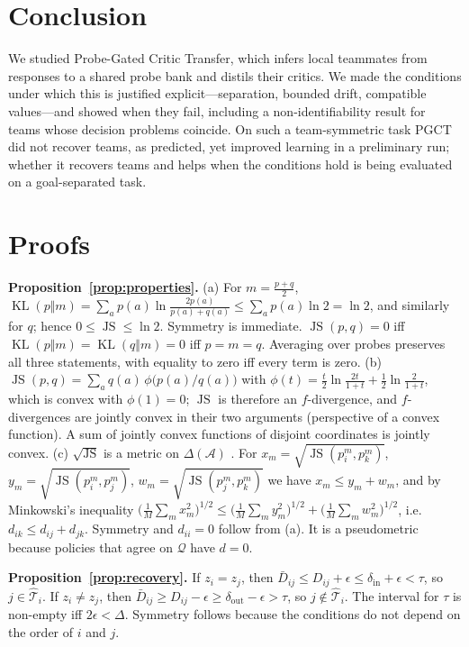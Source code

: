 \documentclass{article}
\theoremstyle{remark}
\newcommand{\JS}{\operatorname{JS}}
\newcommand{\KL}{\operatorname{KL}}
\newcommand{\ours}{PGCT}
\begin{document}
\section{Conclusion}
We studied Probe-Gated Critic Transfer, which infers local teammates from responses to a shared probe bank and distils their critics.
We made the conditions under which this is justified explicit---separation, bounded drift, compatible values---and showed when they
fail, including a non-identifiability result for teams whose decision problems coincide. On such a team-symmetric task \ours{} did not
recover teams, as predicted, yet improved learning in a preliminary run; whether it recovers teams and helps when the conditions hold
is being evaluated on a goal-separated task.

\ifdefined\ijcaistyle
  
\else
  
\fi


\clearpage
\appendix
\onecolumn

\section{Proofs}

\textbf{Proposition~\ref{prop:properties}.}
(a) For $m=\frac{p+q}{2}$, $\KL(p\Vert m)=\sum_a p(a)\ln\frac{2p(a)}{p(a)+q(a)}\le\sum_a p(a)\ln 2=\ln 2$, and similarly for $q$; hence
$0\le\JS\le\ln2$. Symmetry is immediate. $\JS(p,q)=0$ iff $\KL(p\Vert m)=\KL(q\Vert m)=0$ iff $p=m=q$. Averaging over probes preserves
all three statements, with equality to zero iff every term is zero.
(b) $\JS(p,q)=\sum_a q(a)\,\phi\!\big(p(a)/q(a)\big)$ with $\phi(t)=\frac{t}{2}\ln\frac{2t}{1+t}+\frac12\ln\frac{2}{1+t}$, which is convex
with $\phi(1)=0$; $\JS$ is therefore an $f$-divergence, and $f$-divergences are jointly convex in their two arguments (perspective of a
convex function). A sum of jointly convex functions of disjoint coordinates is jointly convex.
(c) $\sqrt{\JS}$ is a metric on $\Delta(\mathcal{A})$ \cite{endres2003metric}. For $x_m=\sqrt{\JS(p_i^m,p_k^m)}$,
$y_m=\sqrt{\JS(p_i^m,p_j^m)}$, $w_m=\sqrt{\JS(p_j^m,p_k^m)}$ we have $x_m\le y_m+w_m$, and by Minkowski's inequality
$\big(\frac1M\sum_m x_m^2\big)^{1/2}\le\big(\frac1M\sum_m y_m^2\big)^{1/2}+\big(\frac1M\sum_m w_m^2\big)^{1/2}$, i.e.\
$d_{ik}\le d_{ij}+d_{jk}$. Symmetry and $d_{ii}=0$ follow from (a). It is a pseudometric because policies that agree on $\mathcal{Q}$ have
$d=0$.

\textbf{Proposition~\ref{prop:recovery}.} If $z_i=z_j$, then $\bar D_{ij}\le D_{ij}+\epsilon\le\delta_{\mathrm{in}}+\epsilon<\tau$, so
$j\in\hat{\mathcal{T}}_i$. If $z_i\ne z_j$, then $\bar D_{ij}\ge D_{ij}-\epsilon\ge\delta_{\mathrm{out}}-\epsilon>\tau$, so
$j\notin\hat{\mathcal{T}}_i$. The interval for $\tau$ is non-empty iff $2\epsilon<\Delta$. Symmetry follows because the conditions do not
depend on the order of $i$ and $j$.
\end{document}
